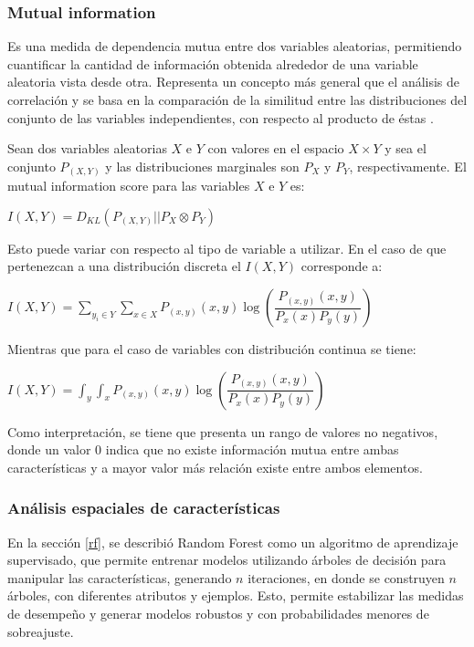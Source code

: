\subsubsection{Mutual information}

Es una medida de dependencia mutua entre dos variables aleatorias, permitiendo cuantificar la cantidad de información obtenida alrededor de una variable aleatoria vista desde otra. Representa un concepto más general que el análisis de correlación y se basa en la comparación de la similitud entre las distribuciones del conjunto de las variables independientes, con respecto al producto de éstas \cite{peng2005feature}.

Sean dos variables aleatorias $X$ e $Y$ con valores en el espacio $X \times Y$ y sea el conjunto $P_{(X,Y)}$ y las distribuciones marginales son $P_X$ y $P_Y$, respectivamente. El mutual information score para las variables $X$ e $Y$ es:

\begin{center}
	$I(X,Y) = D_{KL}(P_{(X,Y)} || P_X \otimes P_Y)$
\end{center}

Esto puede variar con respecto al tipo de variable a utilizar. En el caso de que pertenezcan a una distribución discreta el $I(X,Y)$ corresponde a:

\begin{center}
	$I(X,Y) = \sum_{y_{i} \in Y} \sum_{x \in X} P_{(x,y)} (x,y) \log (\dfrac{P_{(x,y)}(x,y)}{P_{x}(x)P_{y}(y)})$ 
\end{center}

Mientras que para el caso de variables con distribución continua se tiene:

\begin{center}
	$I(X,Y) = \int_{y} \int_{x} P_{(x,y)} (x,y) \log (\dfrac{P_{(x,y)}(x,y)}{P_{x}(x)P_{y}(y)})$
\end{center}

Como interpretación, se tiene que presenta un rango de valores no negativos, donde un valor 0 indica que no existe información mutua entre ambas características y a mayor valor más relación existe entre ambos elementos.

\subsubsection{Análisis espaciales de características}

En la sección \ref{rf}, se describió Random Forest como un algoritmo de aprendizaje supervisado, que permite entrenar modelos utilizando árboles de decisión para manipular las características, generando $n$ iteraciones, en donde se construyen $n$ árboles, con diferentes atributos y ejemplos. Esto, permite estabilizar las medidas de desempeño y generar modelos robustos y con probabilidades menores de sobreajuste.

